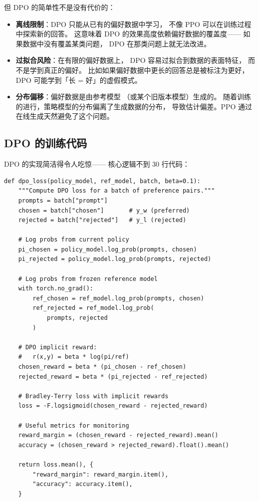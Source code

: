 但 DPO 的简单性不是没有代价的：
\begin{itemize}[noitemsep]
  \item \textbf{离线限制}：DPO 只能从已有的偏好数据中学习，
        不像 PPO 可以在训练过程中探索新的回答。
        这意味着 DPO 的效果高度依赖偏好数据的覆盖度——
        如果数据中没有覆盖某类问题，
        DPO 在那类问题上就无法改进。
  \item \textbf{过拟合风险}：在有限的偏好数据上，
        DPO 容易过拟合到数据的表面特征，
        而不是学到真正的偏好。
        比如如果偏好数据中更长的回答总是被标注为更好，
        DPO 可能学到「长 = 好」的虚假模式。
  \item \textbf{分布偏移}：偏好数据是由参考模型
       （或某个旧版本模型）生成的。
        随着训练的进行，策略模型的分布偏离了生成数据的分布，
        导致估计偏差。PPO 通过在线生成天然避免了这个问题。
\end{itemize}

\subsection{DPO 的训练代码}

DPO 的实现简洁得令人吃惊——
核心逻辑不到 30 行代码：

\begin{lstlisting}[caption={DPO training implementation}]
def dpo_loss(policy_model, ref_model, batch, beta=0.1):
    """Compute DPO loss for a batch of preference pairs."""
    prompts = batch["prompt"]
    chosen = batch["chosen"]       # y_w (preferred)
    rejected = batch["rejected"]   # y_l (rejected)

    # Log probs from current policy
    pi_chosen = policy_model.log_prob(prompts, chosen)
    pi_rejected = policy_model.log_prob(prompts, rejected)

    # Log probs from frozen reference model
    with torch.no_grad():
        ref_chosen = ref_model.log_prob(prompts, chosen)
        ref_rejected = ref_model.log_prob(
            prompts, rejected
        )

    # DPO implicit reward:
    #   r(x,y) = beta * log(pi/ref)
    chosen_reward = beta * (pi_chosen - ref_chosen)
    rejected_reward = beta * (pi_rejected - ref_rejected)

    # Bradley-Terry loss with implicit rewards
    loss = -F.logsigmoid(chosen_reward - rejected_reward)

    # Useful metrics for monitoring
    reward_margin = (chosen_reward - rejected_reward).mean()
    accuracy = (chosen_reward > rejected_reward).float().mean()

    return loss.mean(), {
        "reward_margin": reward_margin.item(),
        "accuracy": accuracy.item(),
    }
\end{lstlisting}

